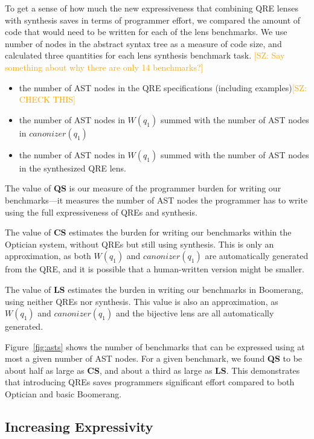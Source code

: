 \documentclass[acmsmall,review,anonymous]{acmart}
\newcommand{\FINISH}[3]{\ifdraft\textcolor{#1}{[#2: #3]}\fi}
\newcommand{\saz}[1]{\FINISH{orange}{SZ}{#1}}
\newcommand{\kw}[1]{\ensuremath{\mathit{#1}}}
\newcommand{\canonizer}{\ensuremath{\kw{canonizer}}}
\newcommand{\QRESize}{\textbf{QS}}
\newcommand{\CanonizerAndSpecSize}{\textbf{CS}}
\newcommand{\LensAndSpecSize}{\textbf{LS}}
\begin{document}
To get a sense of how much the new expressiveness that combining QRE lenses with
synthesis saves in terms of programmer effort, we compared the amount of code
that would need to be written for each of the lens benchmarks.  We use number of
nodes in the abstract syntax tree as a measure of code size, and calculated
three quantities for each lens synthesis benchmark task.  \saz{Say something
  about why there are only 14 benchmarks?}
%
\begin{itemize}
  \item[\QRESize{}] the number of AST nodes in the QRE
  specifications (including examples)\saz{CHECK THIS}
  \item[\CanonizerAndSpecSize{}]  the number of
  AST nodes in $W(q_1)$ summed with the number of AST nodes in $\canonizer(q_1)$
  \item[\LensAndSpecSize{}] the number of AST nodes
  in $W(q_1)$ summed with the number of AST nodes in the synthesized QRE lens.
\end{itemize}

The value of \QRESize{} is our measure of the programmer burden for
writing our benchmarks---it measures the number of AST nodes the programmer has
to write using the full expressiveness of QREs and synthesis.

The value of \CanonizerAndSpecSize{} estimates the burden for writing our
benchmarks within the Optician system, without QREs but still using
synthesis. This is only an approximation, as both $W(q_1)$ and $\canonizer(q_1)$ are
automatically generated from the QRE, and it is possible that a human-written
version might be smaller.

The value of \LensAndSpecSize{} estimates the burden in writing our benchmarks
in Boomerang, using neither QREs nor synthesis. This value is also an
approximation, as $W(q_1)$ and $\canonizer(q_1)$ and the bijective lens are all
automatically generated.

Figure~\ref{fig:asts} shows the number of benchmarks that can be expressed using
at most a given number of AST nodes. For a given benchmark, we found \QRESize{}
to be about half as large as \CanonizerAndSpecSize, and about a third as large
as \LensAndSpecSize{}. This demonstrates that introducing QREs saves programmers
significant effort compared to both Optician and basic Boomerang.

\subsection{Increasing Expressivity}
\end{document}
